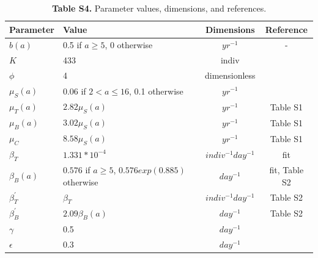\documentclass[10pt,letterpaper]{article}
\begin{document}
\begin{table} %
\caption*{ \textbf{Table S4.} Parameter values, dimensions, and references.}
\newcommand{\head}[1]{\textnormal{\textbf{#1}}}
\small
\begin{tabular}{llcc} %
\hline
\head{Parameter} & \head{Value} & \head{Dimensions} & \head{Reference}\\*
\hline
$b(a)$ & 0.5 if $a \geq 5$, 0 otherwise & $yr^{-1}$ & - \\*
$K $& 433 & indiv & \cite{cross_assessing_2006} \\*
$\phi $& 4 & dimensionless & \cite{cross_assessing_2006} \\* 
$\mu_S(a) $& 0.06 if $2 < a \leq 16$, 0.1 otherwise & $yr^{-1}$ & \cite{cross_assessing_2006, jolles_hidden_2005} \\* 
$\mu_T(a) $& $2.82 \mu_S(a)$ & $yr^{-1}$ & Table S1 \\* 
$\mu_B(a) $& $3.02 \mu_S(a)$ & $yr^{-1}$ & Table S1 \\ 
$\mu_C$ & $8.58 \mu_S(a)$ & $yr^{-1}$ & Table S1 \\ 
$\beta_T $ & $1.331 * 10 ^{-4}$ & $indiv^{-1}day^{-1}$ & fit \\
$\beta_B(a)$ & $0.576$ if $a\geq 5$, $0.576 exp(0.885)$ otherwise & $day^{-1}$ & fit, Table S2 \\
$\beta_{T}^{'}$  & $\beta_T$ & $indiv^{-1}day^{-1}$ & Table S2 \\
$\beta_{B}^{'}$  & $2.09 \beta_{B}(a)$ & $day^{-1}$ & Table S2 \\
$\gamma$& 0.5 & $day^{-1}$ & \cite{rhyan_pathogenesis_2009} \\
$\epsilon$& 0.3 & $day^{-1}$ & \cite{hobbs_state-space_2015, treanor_vaccination_2010, ebinger_simulating_2011} \\
\hline 
\end{tabular}
\end{table} 

\pagebreak
\end{document}
